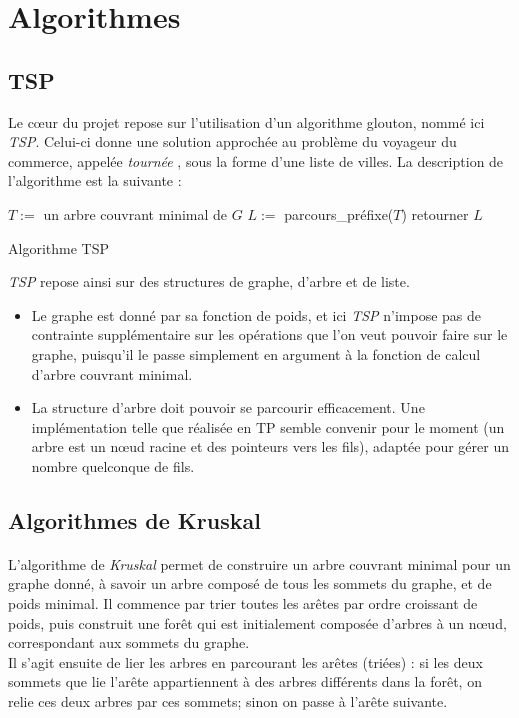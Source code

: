 \documentclass[a4paper]{article}
\begin{document}
\bigskip

\section{Algorithmes}

\subsection{TSP}
Le cœur du projet repose sur l'utilisation d'un algorithme glouton, nommé ici \emph{TSP}. Celui-ci donne une solution approchée au problème du voyageur du commerce, appelée \textit{tournée} , sous la forme d'une liste de villes. La description de l'algorithme est la suivante :

\begin{algorithm}[H]
  \SetAlgoLined
  $T := $ un arbre couvrant minimal de $G$\;
  $L := $ parcours\_préfixe($T$)\;
  retourner $L$\;
  \caption{Algorithme TSP}
\end{algorithm}

\emph{TSP} repose ainsi sur des structures de graphe, d'arbre et de liste. \\
\begin{itemize}
\item Le graphe est donné par sa fonction de poids, et ici \emph{TSP} n'impose pas de contrainte supplémentaire sur les opérations que l'on veut pouvoir faire sur le graphe, puisqu'il le passe simplement en argument à la fonction de calcul d'arbre couvrant minimal.
\item La structure d'arbre doit pouvoir se parcourir efficacement. Une implémentation telle que réalisée en TP semble convenir pour le moment (un arbre est un nœud racine et des pointeurs vers les fils), adaptée pour gérer un nombre quelconque de fils.
\end{itemize}

\subsection{Algorithmes de Kruskal}

\paragraph*{} L'algorithme de \emph{Kruskal} permet de construire un arbre couvrant minimal pour un graphe donné, à savoir un arbre composé de tous les sommets du graphe, et de poids minimal. Il commence par trier toutes les arêtes par ordre croissant de poids, puis construit une forêt qui est initialement composée d'arbres à un nœud, correspondant aux sommets du graphe. \\
Il s'agit ensuite de lier les arbres en parcourant les arêtes (triées) : si les deux sommets que lie l'arête appartiennent à des arbres différents dans la forêt, on relie ces deux arbres par ces sommets; sinon on passe à l'arête suivante.
\end{document}
